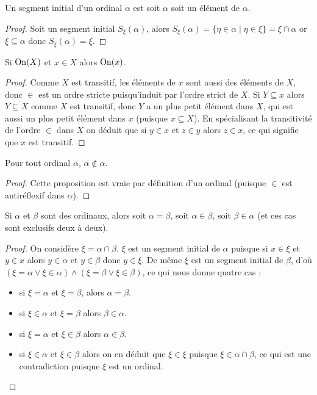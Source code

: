 \begin{prop}
    Un segment initial d'un ordinal $\alpha$ est soit $\alpha$ soit un élément de $\alpha$.
\end{prop}

\begin{proof}
    Soit un segment initial $S_\xi(\alpha)$, alors $S_\xi(\alpha) =\{\eta\in \alpha\mid \eta\in \xi\} = \xi\cap \alpha$ or $\xi\subseteq \alpha$ donc $S_\xi(\alpha) = \xi$.
\end{proof}

\begin{prop}
    Si $\mathrm{On}(X)$ et $x\in X$ alors $\mathrm{On}(x)$.
\end{prop}

\begin{proof}
    Comme $X$ est transitif, les éléments de $x$ sont aussi des éléments de $X$, donc $\in$ est un ordre stricte puisqu'induit par l'ordre strict de $X$. Si $Y\subseteq x$ alors $Y\subseteq X$ comme $X$ est transitif, donc $Y$ a un plus petit élément dans $X$, qui est aussi un plus petit élément dans $x$ (puisque $x\subseteq X$). En spécialisant la transitivité de l'ordre $\in$ dans $X$ on déduit que si $y\in x$ et $z\in y$ alors $z\in x$, ce qui signifie que $x$ est transitif.
\end{proof}

\begin{prop}
    Pour tout ordinal $\alpha$, $\alpha\notin\alpha$.
\end{prop}

\begin{proof}
    Cette proposition est vraie par définition d'un ordinal (puisque $\in$ est antiréflexif dans $\alpha$).
\end{proof}

\begin{prop}
    Si $\alpha$ et $\beta$ sont des ordinaux, alors soit $\alpha = \beta$, soit $\alpha\in\beta$, soit $\beta\in\alpha$ (et ces cas sont exclusifs deux à deux).
\end{prop}

\begin{proof}
    On considère $\xi = \alpha \cap\beta$. $\xi$ est un segment initial de $\alpha$ puisque si $x\in \xi$ et $y\in x$ alors $y\in \alpha$ et $y\in \beta$ donc $y\in \xi$. De même $\xi$ est un segment initial de $\beta$, d'où $(\xi = \alpha\lor \xi \in \alpha)\land (\xi =\beta\lor \xi\in \beta)$, ce qui nous donne quatre cas :
    \begin{itemize}[label=$\bullet$]
        \item si $\xi =\alpha$ et $\xi = \beta$, alors $\alpha = \beta$.
        \item si $\xi \in \alpha$ et $\xi = \beta$ alors $\beta\in \alpha$.
        \item si $\xi = \alpha$ et $\xi \in \beta$ alors $\alpha\in \beta$.
        \item si $\xi \in \alpha$ et $\xi \in \beta$ alors on en déduit que $\xi \in \xi$ puisque $\xi \in \alpha \cap \beta$, ce qui est une contradiction puisque $\xi$ est un ordinal.
    \end{itemize}
\end{proof}

